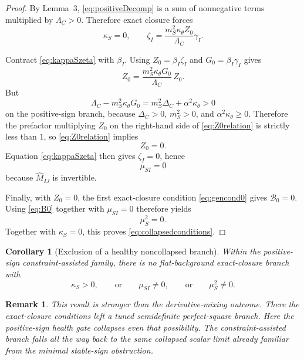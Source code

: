 \documentclass[11pt]{article}
\newtheorem{remark}{Remark}
\newtheorem{corollary}{Corollary}
\begin{document}
\begin{proof}
By Lemma~3, \eqref{eq:positiveDecomp} is a sum of nonnegative terms multiplied by \(\Lambda_C>0\). Therefore exact closure forces
\begin{equation}
\kappa_S=0,
\qquad
\zeta_I
=
\frac{m_S^2\kappa_\theta Z_0}{\Lambda_C}\gamma_I.
\label{eq:kappaSzeta}
\end{equation}

Contract \eqref{eq:kappaSzeta} with \(\beta_I\). Using \(Z_0=\beta_I\zeta_I\) and \(G_0=\beta_I\gamma_I\) gives
\begin{equation}
Z_0
=
\frac{m_S^2\kappa_\theta G_0}{\Lambda_C}\,Z_0.
\label{eq:Z0relation}
\end{equation}
But
\begin{equation}
\Lambda_C-m_S^2\kappa_\theta G_0
=
m_S^2\Delta_C+\alpha^2\kappa_\theta
>
0
\label{eq:strictgap}
\end{equation}
on the positive-sign branch, because \(\Delta_C>0\), \(m_S^2>0\), and \(\alpha^2\kappa_\theta\ge 0\). Therefore the prefactor multiplying \(Z_0\) on the right-hand side of \eqref{eq:Z0relation} is strictly less than \(1\), so \eqref{eq:Z0relation} implies
\begin{equation}
Z_0=0.
\label{eq:Z0zero}
\end{equation}
Equation \eqref{eq:kappaSzeta} then gives \(\zeta_I=0\), hence
\begin{equation}
\mu_{SI}=0
\label{eq:muzero}
\end{equation}
because \(\widehat M_{IJ}\) is invertible.

Finally, with \(Z_0=0\), the first exact-closure condition \eqref{eq:gencond0} gives \(\mathcal B_0=0\). Using \eqref{eq:B0} together with \(\mu_{SI}=0\) therefore yields
\begin{equation}
\mu_S^2=0.
\label{eq:muSzero}
\end{equation}
Together with \(\kappa_S=0\), this proves \eqref{eq:collapsedconditions}.
\end{proof}

\begin{corollary}[Exclusion of a healthy noncollapsed branch]
Within the positive-sign constraint-assisted family, there is no flat-background exact-closure branch with
\[
\kappa_S>0,
\qquad
\text{or}
\qquad
\mu_{SI}\neq 0,
\qquad
\text{or}
\qquad
\mu_S^2\neq 0.
\]
\end{corollary}

\begin{remark}
This result is stronger than the derivative-mixing outcome. There the exact-closure conditions left a tuned semidefinite perfect-square branch. Here the positive-sign health gate collapses even that possibility. The constraint-assisted branch falls all the way back to the same collapsed scalar limit already familiar from the minimal stable-sign obstruction.
\end{remark}
\end{document}
